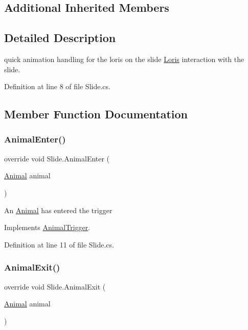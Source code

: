 \subsection*{Additional Inherited Members}


\subsection{Detailed Description}
quick animation handling for the loris on the slide \mbox{\hyperlink{class_loris}{Loris}} interaction with the slide. 



Definition at line 8 of file Slide.\+cs.



\subsection{Member Function Documentation}
\mbox{\label{class_slide_a9ff3efb4447801dcd251378a66d5afa5}} 
\subsubsection{\texorpdfstring{Animal\+Enter()}{AnimalEnter()}}
{\footnotesize\ttfamily override void Slide.\+Animal\+Enter (\begin{DoxyParamCaption}\item[{\mbox{\hyperlink{class_animal}{Animal}}}]{animal }\end{DoxyParamCaption})\hspace{0.3cm}{\ttfamily [virtual]}}



An \mbox{\hyperlink{class_animal}{Animal}} has entered the trigger 



Implements \mbox{\hyperlink{class_animal_trigger_a03181803fa268e0bfcbdc752ee733c40}{Animal\+Trigger}}.



Definition at line 11 of file Slide.\+cs.

\mbox{\label{class_slide_a69c08279e8270df11ec45fba09dd12ba}} 
\subsubsection{\texorpdfstring{Animal\+Exit()}{AnimalExit()}}
{\footnotesize\ttfamily override void Slide.\+Animal\+Exit (\begin{DoxyParamCaption}\item[{\mbox{\hyperlink{class_animal}{Animal}}}]{animal }\end{DoxyParamCaption})\hspace{0.3cm}{\ttfamily [virtual]}}




